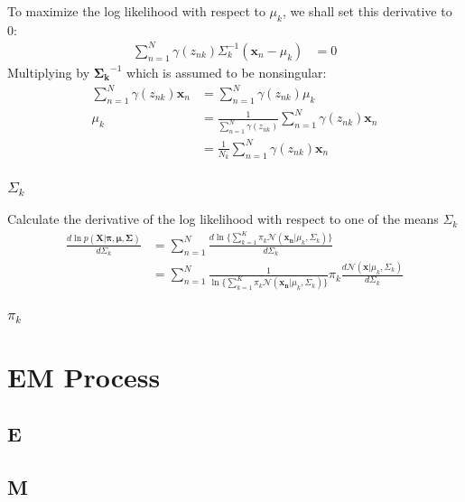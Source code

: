 \documentclass{article}
\begin{document}
\par\noindent
To maximize the log likelihood with respect to \(\mu_k\), we shall set this derivative to 0:
\begin{align*}
    \sum_{n=1}^{N} \gamma(z_{nk})\Sigma_k^{-1}(\mathbf{x}_n-\mu_k) &= 0
\end{align*}
Multiplying by \(\mathbf{\Sigma_k}^{-1}\) which is assumed to be nonsingular:
\begin{align*}
    \sum_{n=1}^{N} \gamma(z_{nk})\mathbf{x}_n &= \sum_{n=1}^{N} \gamma(z_{nk})\mu_k\\
    \mu_k &= \frac{1}{\sum_{n=1}^{N} \gamma(z_{nk})}\sum_{n=1}^{N} \gamma(z_{nk})\mathbf{x}_n\\
    &= \frac{1}{N_k}\sum_{n=1}^{N} \gamma(z_{nk})\mathbf{x}_n
\end{align*}
\bigskip

\subsubsection{\(\Sigma_k\)}
\par\noindent
Calculate the derivative of the log likelihood with respect to one of the means \(\Sigma_k\)
\begin{align*}
    \frac{d\ln{p(\mathbf{X}|\mathbf{\pi},\mathbf{\mu},\mathbf{\Sigma})}}{d\Sigma_k}
    &= \sum_{n=1}^{N} \frac{d\ln{\{\sum_{k=1}^{K}\pi_k\mathcal{N}(\mathbf{x_n}|\mu_k, \Sigma_k)\}}}{d\Sigma_k}\\
    &= \sum_{n=1}^{N} \frac{1}{\ln{\{\sum_{k=1}^{K}\pi_k\mathcal{N}(\mathbf{x_n}|\mu_k, \Sigma_k)\}}}\pi_k\frac{d\mathcal{N}(\mathbf{x}|\mu_k, \Sigma_k)}{d\Sigma_k}
\end{align*}
\bigskip


\subsubsection{\(\pi_k\)}


\section{EM Process}
\subsection{E}



\subsection{M}
\end{document}
